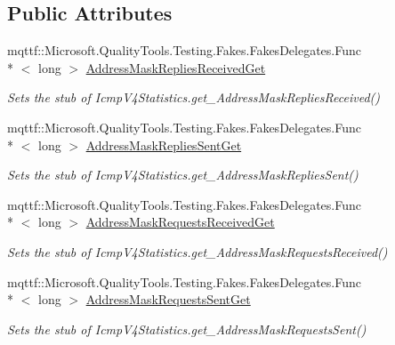 \subsection*{Public Attributes}
\begin{DoxyCompactItemize}
\item 
mqttf\-::\-Microsoft.\-Quality\-Tools.\-Testing.\-Fakes.\-Fakes\-Delegates.\-Func\\*
$<$ long $>$ \hyperlink{class_system_1_1_net_1_1_network_information_1_1_fakes_1_1_stub_icmp_v4_statistics_a3429362ce2040acda36bc97822bcd00c}{Address\-Mask\-Replies\-Received\-Get}
\begin{DoxyCompactList}\small\item\em Sets the stub of Icmp\-V4\-Statistics.\-get\-\_\-\-Address\-Mask\-Replies\-Received()\end{DoxyCompactList}\item 
mqttf\-::\-Microsoft.\-Quality\-Tools.\-Testing.\-Fakes.\-Fakes\-Delegates.\-Func\\*
$<$ long $>$ \hyperlink{class_system_1_1_net_1_1_network_information_1_1_fakes_1_1_stub_icmp_v4_statistics_a409ab8d6180c00c20c9c9616dc556a3a}{Address\-Mask\-Replies\-Sent\-Get}
\begin{DoxyCompactList}\small\item\em Sets the stub of Icmp\-V4\-Statistics.\-get\-\_\-\-Address\-Mask\-Replies\-Sent()\end{DoxyCompactList}\item 
mqttf\-::\-Microsoft.\-Quality\-Tools.\-Testing.\-Fakes.\-Fakes\-Delegates.\-Func\\*
$<$ long $>$ \hyperlink{class_system_1_1_net_1_1_network_information_1_1_fakes_1_1_stub_icmp_v4_statistics_a23417251b0863348e959c0495b0ba3fe}{Address\-Mask\-Requests\-Received\-Get}
\begin{DoxyCompactList}\small\item\em Sets the stub of Icmp\-V4\-Statistics.\-get\-\_\-\-Address\-Mask\-Requests\-Received()\end{DoxyCompactList}\item 
mqttf\-::\-Microsoft.\-Quality\-Tools.\-Testing.\-Fakes.\-Fakes\-Delegates.\-Func\\*
$<$ long $>$ \hyperlink{class_system_1_1_net_1_1_network_information_1_1_fakes_1_1_stub_icmp_v4_statistics_aef1ca2a611bc7ffef8054a54946002ba}{Address\-Mask\-Requests\-Sent\-Get}
\begin{DoxyCompactList}\small\item\em Sets the stub of Icmp\-V4\-Statistics.\-get\-\_\-\-Address\-Mask\-Requests\-Sent()\end{DoxyCompactList}\item 

\end{DoxyCompactItemize}
